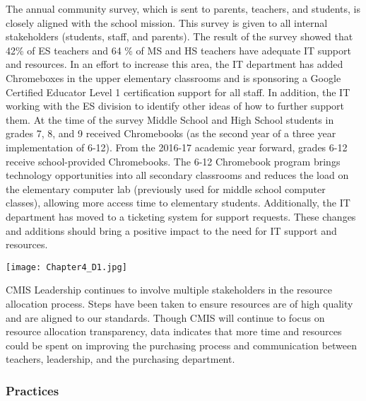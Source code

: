 \begin{findings}
The annual community survey, which is sent to parents, teachers, and students, is closely aligned with the school mission. This survey is given to all internal stakeholders (students, staff, and parents). The result of the survey showed that 42\% of ES teachers and 64 \% of MS and HS teachers have adequate IT support and resources.  In an effort to increase this area, the IT department has added Chromeboxes in the upper elementary classrooms and is sponsoring a Google Certified Educator Level 1 certification support for all staff. In addition, the IT working with the ES division to identify other ideas of how to further support them. At the time of the survey Middle School and High School students in grades 7, 8, and 9 received Chromebooks (as the second year of a three year implementation of 6-12). From the 2016-17 academic year forward, grades 6-12 receive school-provided Chromebooks. The 6-12 Chromebook program brings technology opportunities into all secondary classrooms and reduces the load on the elementary computer lab (previously used for middle school computer classes), allowing more access time to elementary students. Additionally, the IT department has moved to a ticketing system for support requests. These changes and additions should bring a positive impact to the need for IT support and resources.

{\centering\texttt{[image: Chapter4\_D1.jpg]}}


CMIS Leadership continues to involve multiple stakeholders in the resource allocation process. Steps have been taken to ensure resources are of high quality and are aligned to our standards. Though CMIS will continue to focus on resource allocation transparency, data indicates that more time and resources could be spent on improving the purchasing process and communication between teachers, leadership, and the purchasing department.  
\end{findings}

\subsubsection{Practices}



